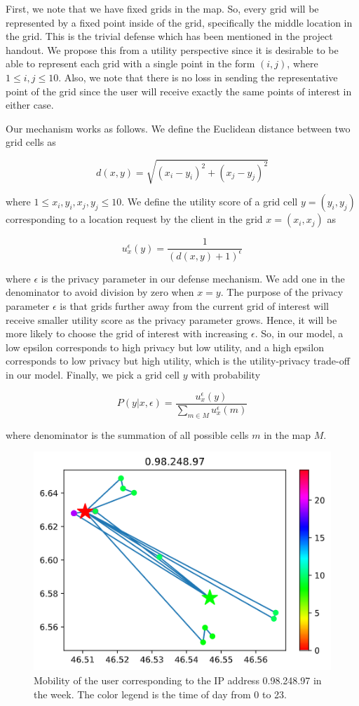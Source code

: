 \documentclass[9pt,conference]{IEEEtran}
\begin{document}
First, we note that we have fixed grids in the map. So, every grid will be represented by a fixed point inside of the grid, specifically the middle location in the grid. This is the trivial defense which has been mentioned in the project handout. We propose this from a utility perspective since it is desirable to be able to represent each grid with a single point in the form $(i,j)$, where $1 \leq i,j \leq 10$. Also, we note that there is no loss in sending the representative point of the grid since the user will receive exactly the same points of interest in either case.

Our mechanism works as follows. We define the Euclidean distance between two grid cells as

$$d(x,y) = \sqrt{(x_i-y_i)^2 + (x_j-y_j)^2}$$

where $1 \leq x_i,y_i,x_j,y_j \leq 10$. We define the utility score of a grid cell $y=(y_i,y_j)$ corresponding to a location request by the client in the grid $x=(x_i,x_j)$ as

$$u_x^{\epsilon}(y)=\frac{1}{(d(x,y)+1)^\epsilon}$$

where $\epsilon$ is the privacy parameter in our defense mechanism. We add one in the denominator to avoid division by zero when $x=y$. The purpose of the privacy parameter $\epsilon$ is that grids further away from the current grid of interest will receive smaller utility score as the privacy parameter grows. Hence, it will be more likely to choose the grid of interest with increasing $\epsilon$. So, in our model, a low epsilon corresponds to high privacy but low utility, and a high epsilon corresponds to low privacy but high utility, which is the utility-privacy trade-off in our model. Finally, we pick a grid cell $y$ with probability

$$P(y|x,\epsilon) = \frac{u_x^{\epsilon}(y)}{\sum_{m \in M} u_x^{\epsilon}(m)}$$

where denominator is the summation of all possible cells $m$ in the map $M$.

\begin{figure}
    \centering
    \includegraphics[width=0.5\linewidth]{images/0.98.248.87_insecure.png}
    \caption{Mobility of the user corresponding to the IP address 0.98.248.97 in the week. The color legend is the time of day from 0 to 23.}
    \label{fig:insecure}
\end{figure}
\end{document}
